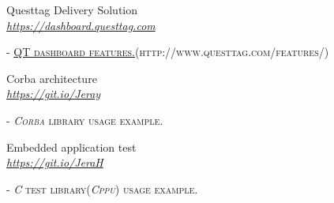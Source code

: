 \documentclass[10pt]{article} %
\begin{document}
{\begin{minipage}[t]{0.5\textwidth}


{\raggedright\large Questtag Delivery Solution\\
\textit{\href{https://dashboard.questtag.com}{https://dashboard.questtag.com}}\\[2pt]
}

\textsc{- \href{http://www.questtag.com/features/}{QT dashboard features.}(http://www.questtag.com/features/)}\\



%
%





{\raggedright\large Corba architecture \\
	\textit{\href {https://github.com/Bitaron/Corba}{https://git.io/Jeray}}\\[5pt]}
\textsc{- \textit{Corba} library usage example.}\\




{\raggedright\large Embedded application test \\
	\textit{\href {https://github.com/Bitaron/C}{https://git.io/JeraH}}\\[5pt]}
\textsc{- \textit{C} test library(\textit{Cppu}) usage example.}\\



%





\end{minipage}}
\end{document}

